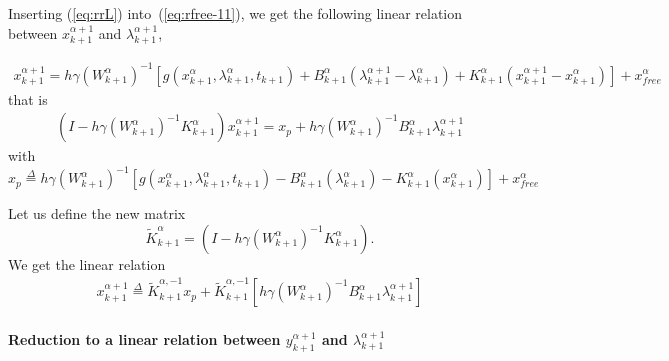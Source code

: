 Inserting (\ref{eq:rrL}) into~(\ref{eq:rfree-11}), we get the following linear relation between $x^{\alpha+1}_{k+1}$ and
$\lambda^{\alpha+1}_{k+1}$, 

\begin{equation}
   \begin{array}{l}
     x^{\alpha+1}_{k+1} = h\gamma(W^{\alpha}_{k+1} )^{-1}\left[g(x^{\alpha}_{k+1},\lambda^{\alpha}_{k+1},t_{k+1}) +
    B^{\alpha}_{k+1} (\lambda^{\alpha+1}_{k+1} - \lambda^{\alpha}_{k+1})+K^{\alpha}_{k+1}
    (x^{\alpha+1}_{k+1} - x^{\alpha}_{k+1}) \right ] +x^\alpha_{free}
\end{array}
\end{equation}
that is 
\begin{equation}
  \begin{array}{l}
    (I-h \gamma (W^{\alpha}_{k+1})^{-1}K^{\alpha}_{k+1})x^{\alpha+1}_{k+1}=x_p + h \gamma (W^{\alpha}_{k+1})^{-1}    B^{\alpha}_{k+1} \lambda^{\alpha+1}_{k+1}
   \end{array}
\end{equation}
with 
\begin{equation}
  \boxed{x_p \stackrel{\Delta}{=}  h\gamma(W^{\alpha}_{k+1} )^{-1}\left[g(x^{\alpha}_{k+1},\lambda^{\alpha}_{k+1},t_{k+1}) 
    -B^{\alpha}_{k+1} (\lambda^{\alpha}_{k+1})-K^{\alpha}_{k+1} (x^{\alpha}_{k+1}) \right ] +x^\alpha_{free}}
\end{equation}



Let us  define the new matrix
\begin{equation}
\tilde K^{\alpha}_{k+1}=(I-h \gamma (W^{\alpha}_{k+1})^{-1} K^{\alpha}_{k+1}).
\label{eq:hatW}
\end{equation}
We get the linear relation
\begin{equation}
  \label{eq:rfree-13}
  \begin{array}{l}
 \boxed{   x^{\alpha+1}_{k+1}\stackrel{\Delta}{=} \tilde K^{\alpha,-1}_{k+1} x_p + \tilde K^{\alpha,-1}_{k+1} \left[ h \gamma (W^{\alpha}_{k+1})^{-1}    B^{\alpha}_{k+1} \lambda^{\alpha+1}_{k+1}\right]}
   \end{array}
\end{equation}



\paragraph{Reduction to a linear relation between  $y^{\alpha+1}_{k+1}$ and
$\lambda^{\alpha+1}_{k+1}$}

